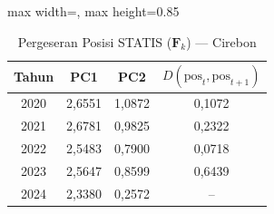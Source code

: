 \begin{table}[H]
\centering
\caption{Pergeseran Posisi STATIS ($\mathbf{F}_k$) --- Cirebon} \label{tab:app2jarak_statis_skor_cirebon}
\begin{adjustbox}{max width=\textwidth, max height=0.85\textheight}
\begin{tabular}{|c|c|c|c|}
\hline
\textbf{Tahun} & \textbf{PC1} & \textbf{PC2} & \textbf{$D(\text{pos}_t, \text{pos}_{t+1})$} \\
\hline
2020 & 2,6551 & 1,0872 & 0,1072 \\
2021 & 2,6781 & 0,9825 & 0,2322 \\
2022 & 2,5483 & 0,7900 & 0,0718 \\
2023 & 2,5647 & 0,8599 & 0,6439 \\
2024 & 2,3380 & 0,2572 & -- \\
\hline
\end{tabular}
\end{adjustbox}
\end{table}